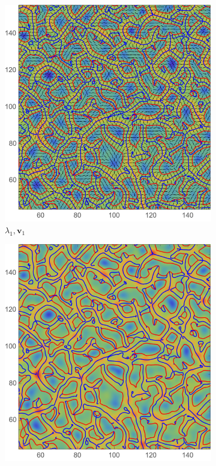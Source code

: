 \documentclass[a4paper, 11pt]{article}
\begin{document}
\begin{figure}
\centering
\begin{subfigure}[b]{0.49\textwidth}
\includegraphics[width=\textwidth]{Eulerian_L}
\caption{$\lambda_1,\bm{v}_1$}
\end{subfigure}
\begin{subfigure}[b]{0.49\textwidth}
\includegraphics[width=\textwidth]{Eulerian_dens_old}

\end{subfigure}
\end{figure}
\end{document}
